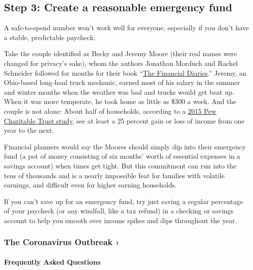 \hypertarget{step-3-create-a-reasonable-emergency-fund}{%
\subsection{Step 3: Create a reasonable emergency
fund}\label{step-3-create-a-reasonable-emergency-fund}}

A safe-to-spend number won't work well for everyone, especially if you
don't have a stable, predictable paycheck.

Take the couple identified as Becky and Jeremy Moore (their real names
were changed for privacy's sake), whom the authors Jonathan Morduch and
Rachel Schneider followed for months for their book
``\href{https://www.usfinancialdiaries.org/book}{The Financial
Diaries}.'' Jeremy, an Ohio-based long-haul truck mechanic, earned most
of his salary in the summer and winter months when the weather was bad
and trucks would get beat up. When it was more temperate, he took home
as little as \$300 a week. And the couple is not alone: About half of
households, according to a
\href{https://www.pewtrusts.org/~/media/Assets/2015/01/FSM_Balance_Sheet_Report.pdf}{2015
Pew Charitable Trust study}, see at least a 25 percent gain or loss of
income from one year to the next.

Financial planners would say the Moores should simply dip into their
emergency fund (a pot of money consisting of six months' worth of
essential expenses in a savings account) when times get tight. But this
commitment can run into the tens of thousands and is a nearly impossible
feat for families with volatile earnings, and difficult even for higher
earning households.

If you can't save up for an emergency fund, try just saving a regular
percentage of your paycheck (or any windfall, like a tax refund) in a
checking or savings account to help you smooth over income spikes and
dips throughout the year.

\href{https://www.nytimes.com/news-event/coronavirus?action=click\&pgtype=Article\&state=default\&region=MAIN_CONTENT_3\&context=storylines_faq}{}

\hypertarget{the-coronavirus-outbreak-}{%
\subsubsection{The Coronavirus Outbreak
›}\label{the-coronavirus-outbreak-}}

\hypertarget{frequently-asked-questions}{%
\paragraph{Frequently Asked
Questions}\label{frequently-asked-questions}}

